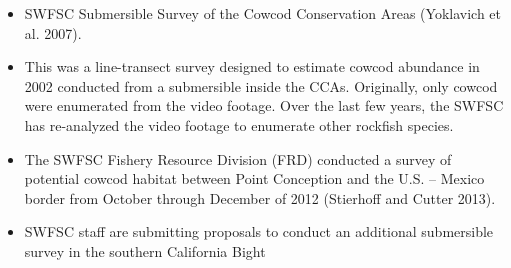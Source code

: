 \documentclass[11pt,
  english,
  a4paper,
]{article}
\begin{document}
\begin{itemize}

  \begin{itemize}
  \item


    SWFSC Submersible Survey of the Cowcod Conservation Areas {(Yoklavich et al. 2007)\leavevmode\tagmcend\tagstructend}.

    \tagmcend\tagstructend\tagstructend

    \tagmcend\tagstructend\tagstructend
  \item


    This was a line-transect survey designed to estimate cowcod abundance in 2002 conducted from a submersible inside the CCAs. Originally, only cowcod were enumerated from the video footage. Over the last few years, the SWFSC has re-analyzed the video footage to enumerate other rockfish species.

    \tagmcend\tagstructend\tagstructend

    \tagmcend\tagstructend\tagstructend
  \item


    The SWFSC Fishery Resource Division (FRD) conducted a survey of potential cowcod habitat between Point Conception and the U.S. -- Mexico border from October through December of 2012 {(Stierhoff and Cutter 2013)\leavevmode\tagmcend\tagstructend}.

    \tagmcend\tagstructend\tagstructend

    \tagmcend\tagstructend\tagstructend
  \item


    SWFSC staff are submitting proposals to conduct an additional submersible survey in the southern California Bight


\end{itemize}
\end{itemize}
\end{document}
